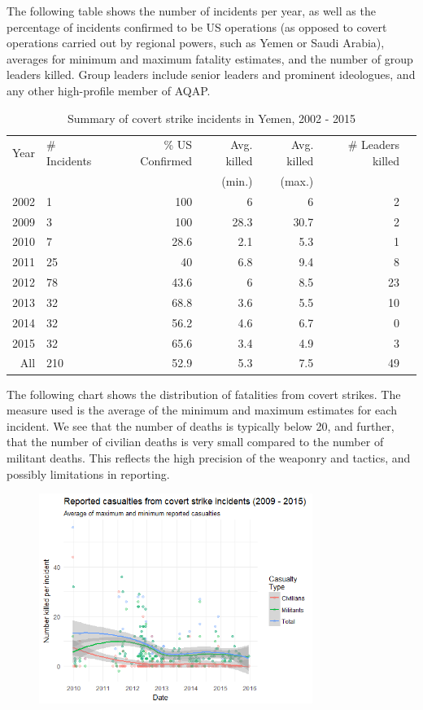 \documentclass[letterpaper,12pt]{article}
\theoremstyle{definition}
\begin{document}
The following table shows the number of incidents per year, as well as the percentage of incidents confirmed to be US operations (as opposed to covert operations carried out by regional powers, such as Yemen or Saudi Arabia), averages for minimum and maximum fatality estimates, and the number of group leaders killed. Group leaders include senior leaders and prominent ideologues, and any other high-profile member of AQAP. 

\begin{table}[ht!]
\centering
\caption {Summary of covert strike incidents in Yemen, 2002 - 2015}
\begin{tabular}{rlrrrrr}
  \hline
Year & \# Incidents & \% US Confirmed & Avg. killed & Avg. killed & \# Leaders killed \\ 
& & & (min.) & (max.) &\\
  \hline
2002 &   1 & 100 & 6 & 6 & 2 \\ 
2009 &   3 & 100 & 28.3 & 30.7 & 2 \\ 
2010 &   7 & 28.6 & 2.1 & 5.3 & 1 \\ 
2011 &  25 & 40 & 6.8 & 9.4 & 8\\ 
2012 &  78 & 43.6 & 6 & 8.5 & 23 \\ 
2013 &  32 & 68.8 & 3.6 & 5.5 & 10 \\ 
2014 &  32 & 56.2 & 4.6 & 6.7 & 0 \\ 
2015 &  32 & 65.6 & 3.4 & 4.9 & 3 \\ 
  \hline
All & 210 & 52.9 & 5.3 & 7.5 & 49 \\ 
   \hline
\end{tabular}
\end{table}

The following chart shows the distribution of fatalities from covert strikes. The measure used is the average of the minimum and maximum estimates for each incident. We see that the number of deaths is typically below 20, and further, that the number of civilian deaths is very small compared to the number of militant deaths. This reflects the high precision of the weaponry and tactics, and possibly limitations in reporting.

\begin{figure}[htb!]
  \includegraphics[width=3.5in]{strike_killed.png}
\end{figure}
\end{document}
